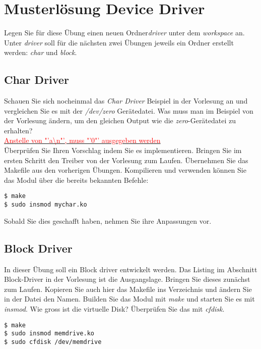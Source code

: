 \section{Musterlösung Device Driver}

Legen Sie für diese Übung einen neuen Ordner\emph{driver} unter dem \emph{workspace} an.
Unter \emph{driver} soll für die nächsten zwei Übungen jeweils ein Ordner erstellt werden:
\emph{char} und \emph{block}.

\subsection{Char Driver}

Schauen Sie sich nocheinmal das \emph{Char Driver} Beispiel in der Vorlesung an und vergleichen Sie es mit der
\emph{/dev/zero} Gerätedatei. Was muss man im Beispiel von der Vorlesung ändern, um den gleichen Output wie die
\emph{zero}-Gerätedatei zu erhalten? \\

\underline{\textcolor{red}{Anstelle von "'a\textbackslash n"', muss "'0"' ausgegeben werden}\hspace{0.47\textwidth}} \\

Überprüfen Sie Ihren Vorschlag indem Sie es implementieren. Bringen Sie im ersten Schritt den Treiber von der Vorlesung
zum Laufen. Übernehmen Sie das Makefile aus den vorherigen Übungen. Kompilieren und verwenden können Sie das Modul über die bereits
bekannten Befehle:
\begin{lstlisting}
$ make
$ sudo insmod mychar.ko
\end{lstlisting}

Sobald Sie dies geschafft haben, nehmen Sie ihre Anpassungen vor.

\subsection{Block Driver}

In dieser Übung soll ein Block driver entwickelt werden. Das Listing im Abschnitt Block-Driver in der Vorlesung ist die Ausgangslage. Bringen Sie
dieses zunächst zum Laufen.
Kopieren Sie auch hier das Makefile ins Verzeichnis und ändern Sie in der Datei den Namen. Builden Sie das Modul
mit \emph{make} und starten Sie es mit \emph{insmod}. Wie gross ist die virtuelle Disk? Überprüfen Sie das mit \emph{cfdisk}.

\begin{lstlisting}
$ make
$ sudo insmod memdrive.ko
$ sudo cfdisk /dev/memdrive
\end{lstlisting}

